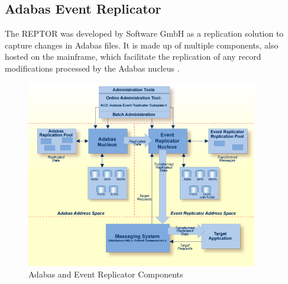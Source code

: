 \subsection{Adabas Event Replicator}
\label{ch02:fundamentals:adabas:reptor}
The \ac{REPTOR} was developed by Software GmbH as a replication solution to capture changes in Adabas files. It is made up of multiple components, also hosted on the mainframe, which facilitate the replication of any record modifications processed by the Adabas nucleus \cite{storr2011reptor}.

\begin{figure}[htbp]
 \centering
 \includegraphics[width=0.9\textwidth]{chapters/images/reptor_architecture.png}
 \caption[Adabas and Event Replicator Components]{Adabas and Event Replicator Components \cite{reptorconcepts}}
 \label{fig:fundamentals:reptorarchitecture}
\end{figure}

